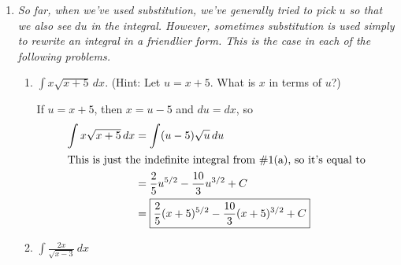 \documentclass[main]{subfiles}
\begin{document}
\begin{enumerate}
\begin{enumerate}
      \begin{solution}
        Here, we have a sum in the numerator, so we can split the
        integrand into a sum of two fractions:
        \begin{align*}
          \int \frac{2u + 3}{\sqrt{u}}\,du &= \int \left( \frac{2u}{\sqrt{u}}
            + \frac{3}{\sqrt{u}} \right) du \\
          &= \int \left( 2u^{1/2} + 3 u^{-1/2} \right) du \\
          &= \boxed{\frac{4}{3} u^{3/2} + 6 u^{1/2} + C}
        \end{align*}
      \end{solution}
    \end{enumerate}    
    \probonly{}

\item 

  \textit{So far, when we've used substitution, we've generally tried to
    pick $u$ so that we also see $du$ in the integral.  However, sometimes
    substitution is used simply to rewrite an integral in a friendlier
    form.  This is the case in each of the following problems.}

  \begin{enumerate}
  \item
    \begin{problem}[\vfill]
      $\displaystyle \int x \sqrt{x+5}\,dx$.  (Hint: Let $u = x + 5$.  What
      is $x$ in terms of $u$?)
    \end{problem}

    \begin{solution} %
      If $u = x+5$, then $x = u-5$ and $du =dx$, so
      \begin{align*}
        \int x \sqrt{x+5} \,dx & =  \int (u -5) \sqrt{u}\,du \\
        \intertext{This is just the indefinite integral from
          {{{{\#1}}(a)}}, so it's equal to} %
        & =  \frac{2}{5}u^{5/2} - \frac{10}{3} u^{3/2} + C \\
        & = \boxed{\frac{2}{5} (x+5)^{5/2} - \frac{10}{3} (x+5)^{3/2} + C}
      \end{align*}
    \end{solution}

  \item
    \begin{problem}[\vfill]
      $\displaystyle \int \frac{2x} {\sqrt{x - 3}}\,dx$
    \end{problem}


\end{enumerate}
\end{enumerate}
\end{document}
